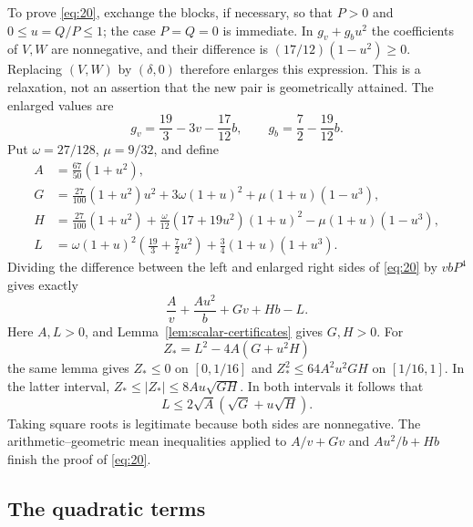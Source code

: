 To prove \eqref{eq:20}, exchange the blocks, if necessary, so that
$P>0$ and $0\le u=Q/P\le1$; the case $P=Q=0$ is immediate.
In $g_v+g_bu^2$ the coefficients of $V,W$ are nonnegative, and their
difference is $(17/12)(1-u^2)\ge0$. Replacing $(V,W)$ by
$(\delta,0)$ therefore enlarges this expression. This is a relaxation,
not an assertion that the new pair is geometrically attained. The
enlarged values are
\[
 g_v=\frac{19}{3}-3v-\frac{17}{12}b,
 \qquad g_b=\frac72-\frac{19}{12}b.
\]
Put $\omega=27/128$, $\mu=9/32$, and define
\[
\begin{aligned}
 A&=\frac{67}{50}(1+u^2),\\
 G&=\frac{27}{100}(1+u^2)u^2
       +3\omega(1+u)^2+\mu(1+u)(1-u^3),\\
 H&=\frac{27}{100}(1+u^2)
       +\frac\omega{12}(17+19u^2)(1+u)^2
       -\mu(1+u)(1-u^3),\\
 L&=\omega(1+u)^2\left(\frac{19}{3}+\frac72u^2\right)
       +\frac34(1+u)(1+u^3).
\end{aligned}
\]
Dividing the difference between the left and enlarged right sides of
\eqref{eq:20} by $vbP^4$ gives exactly
\[
 \frac Av+\frac{Au^2}{b}+Gv+Hb-L.
\]
Here $A,L>0$, and Lemma~\ref{lem:scalar-certificates} gives $G,H>0$.
For
\[
 Z_*=L^2-4A(G+u^2H)
\]
the same lemma gives $Z_*\le0$ on $[0,1/16]$ and
$Z_*^2\le64A^2u^2GH$ on $[1/16,1]$. In the latter interval,
$Z_*\le|Z_*|\le8Au\sqrt{GH}$. In both intervals it follows that
\[
 L\le2\sqrt A(\sqrt G+u\sqrt H).
\]
Taking square roots is legitimate because both sides are nonnegative.
The arithmetic--geometric mean inequalities applied to $A/v+Gv$ and
$Au^2/b+Hb$ finish the proof of \eqref{eq:20}.

\subsection{The quadratic terms}

